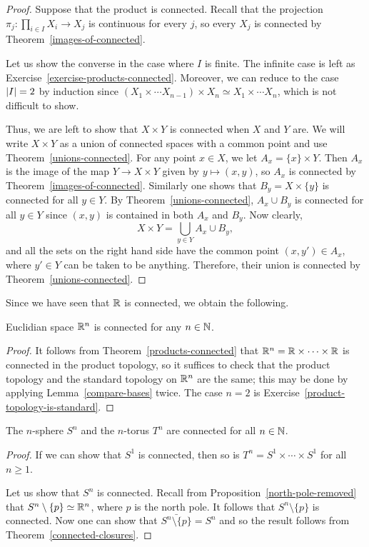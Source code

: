 \begin{proof}
  Suppose that the product is connected. Recall that the projection $\pi_j : \prod_{i \in I} X_i \to X_j$ is continuous for every $j$, so every $X_j$ is connected by Theorem~\ref{images-of-connected}.
  
  Let us show the converse in the case where $I$ is finite. The infinite case is left as Exercise~\ref{exercise-products-connected}. Moreover, we can reduce to the case $\lvert I \rvert = 2$ by induction since $(X_1 \times \cdots X_{n-1}) \times X_n \simeq X_1 \times \cdots X_n$, which is not difficult to show.
  
  Thus, we are left to show that $X \times Y$ is connected when $X$ and $Y$ are. We will write $X \times Y$ as a union of connected spaces with a common point and use Theorem~\ref{unions-connected}. For any point $x \in X$, we let $A_x = \{x \} \times Y$. Then $A_x$ is the image of the map $Y \to X \times Y$ given by $y \mapsto (x,y)$, so $A_x$ is connected by Theorem~\ref{images-of-connected}. Similarly one shows that $B_y = X \times \{y\}$ is connected for all $y \in Y$. By Theorem~\ref{unions-connected}, $A_x \cup B_y$ is connected for all $y \in Y$ since $(x,y)$ is contained in both $A_x$ and $B_y$. Now clearly,
  \[
    X \times Y = \bigcup_{y \in Y} A_x \cup B_y,
  \]
  and all the sets on the right hand side have the common point $(x,y') \in A_x$, where $y' \in Y$ can be taken to be anything. Therefore, their union is connected by Theorem~\ref{unions-connected}.
\end{proof}
Since we have seen that $\mathbb{R}$ is connected, we obtain the following.
\begin{cor}
  Euclidian space $\mathbb{R}^n$ is connected for any $n \in \mathbb{N}$.
\end{cor}
\begin{proof}
  It follows from Theorem~\ref{products-connected} that $\mathbb{R}^n = \mathbb{R} \times \cdots \times \mathbb{R}$ is connected in the product topology, so it suffices to check that the product topology and the standard topology on $\mathbb{R}^n$ are the same; this may be done by applying Lemma~\ref{compare-bases} twice. The case $n = 2$ is Exercise~\ref{product-topology-is-standard}.
\end{proof}
\begin{prop}
  The $n$-sphere $S^n$ and the $n$-torus $T^n$ are connected for all $n \in \mathbb{N}$.
\end{prop}
\begin{proof}
  If we can show that $S^1$ is connected, then so is $T^n = S^1 \times \cdots \times S^1$ for all $n \geq 1$.
  
  Let us show that $S^n$ is connected. Recall from Proposition~\ref{north-pole-removed} that $S^n \setminus \{p\} \simeq \mathbb{R}^n$, where $p$ is the north pole. It follows that $S^n \setminus \{p\}$ is connected. Now one can show that $\bar{S^n \setminus \{p\}} = S^n$ and so the result follows from Theorem~\ref{connected-closures}.
\end{proof}
